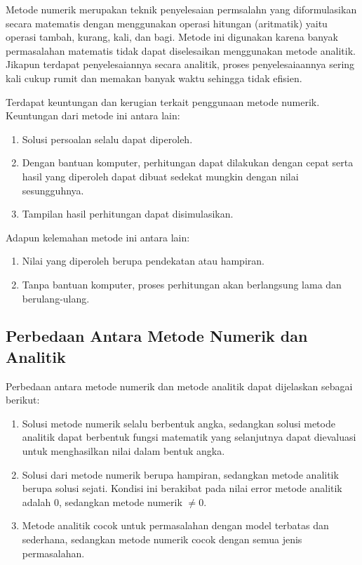 \documentclass[
]{book}
\providecommand{\tightlist}{%
  \setlength{\itemsep}{0pt}\setlength{\parskip}{0pt}}
\theoremstyle{definition}
\theoremstyle{definition}
\theoremstyle{definition}
\theoremstyle{definition}
\theoremstyle{remark}
\begin{document}
Metode numerik merupakan teknik penyelesaian permsalahn yang diformulasikan secara matematis dengan menggunakan operasi hitungan (aritmatik) yaitu operasi tambah, kurang, kali, dan bagi. Metode ini digunakan karena banyak permasalahan matematis tidak dapat diselesaikan menggunakan metode analitik. Jikapun terdapat penyelesaiannya secara analitik, proses penyelesaiaannya sering kali cukup rumit dan memakan banyak waktu sehingga tidak efisien.

Terdapat keuntungan dan kerugian terkait penggunaan metode numerik. Keuntungan dari metode ini antara lain:

\begin{enumerate}
\def\labelenumi{\arabic{enumi}.}
\tightlist
\item
  Solusi persoalan selalu dapat diperoleh.
\item
  Dengan bantuan komputer, perhitungan dapat dilakukan dengan cepat serta hasil yang diperoleh dapat dibuat sedekat mungkin dengan nilai sesungguhnya.
\item
  Tampilan hasil perhitungan dapat disimulasikan.
\end{enumerate}

Adapun kelemahan metode ini antara lain:

\begin{enumerate}
\def\labelenumi{\arabic{enumi}.}
\tightlist
\item
  Nilai yang diperoleh berupa pendekatan atau hampiran.
\item
  Tanpa bantuan komputer, proses perhitungan akan berlangsung lama dan berulang-ulang.
\end{enumerate}

\hypertarget{diffanalitycnumeric}{%
\subsection{Perbedaan Antara Metode Numerik dan Analitik}\label{diffanalitycnumeric}}

Perbedaan antara metode numerik dan metode analitik dapat dijelaskan sebagai berikut:

\begin{enumerate}
\def\labelenumi{\arabic{enumi}.}
\item
  Solusi metode numerik selalu berbentuk angka, sedangkan solusi metode analitik dapat berbentuk fungsi matematik yang selanjutnya dapat dievaluasi untuk menghasilkan nilai dalam bentuk angka.
\item
  Solusi dari metode numerik berupa hampiran, sedangkan metode analitik berupa solusi sejati. Kondisi ini berakibat pada nilai error metode analitik adalah 0, sedangkan metode numerik \(\neq 0\).
\item
  Metode analitik cocok untuk permasalahan dengan model terbatas dan sederhana, sedangkan metode numerik cocok dengan semua jenis permasalahan.
\end{enumerate}
\end{document}
